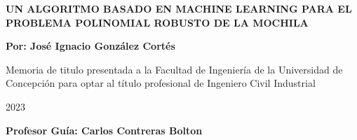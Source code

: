 \documentclass[spanish, a4paper, 12pt, openany,final]{book}
\begin{document}
\def\biblio{}   %

\begin{titlepage}
	
	
	\thispagestyle{frontpage}
	
	\begin{center}
		
		\vspace*{4\baselineskip}
		
		
		{\Huge \textbf{UN ALGORITMO BASADO EN MACHINE LEARNING PARA EL PROBLEMA POLINOMIAL ROBUSTO DE LA MOCHILA\\}}
		\vspace*{1.5\baselineskip}
		
		
		\vspace*{1,5\baselineskip}
		
		\large{\textbf{Por: José Ignacio González Cortés}}\\
		
		\vspace{1,5\baselineskip}
		
		\large{Memoria de titulo presentada a la Facultad de Ingeniería de la Universidad de Concepción para optar al título profesional de Ingeniero Civil Industrial} 
		
		\vspace{1,5\baselineskip}
		\DTMspanishMonthname{\month} 2023  \\
		\vspace{1,5\baselineskip}
		
		\large{\textbf{Profesor Guía: Carlos Contreras Bolton}}\\
		
	\end{center}
	
	\vspace*{4\baselineskip}
	
\end{titlepage}


\vfill

\end{document}
